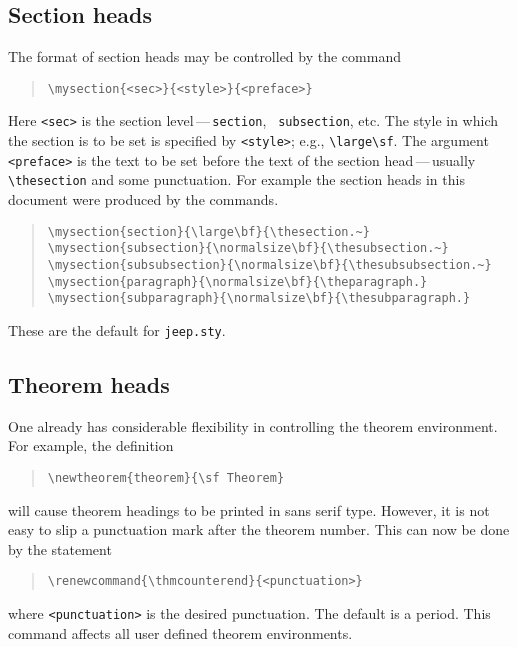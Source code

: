 \subsection{Section heads}
The format of section heads may be controlled by the command
\begin{quote}
\begin{verbatim}
\mysection{<sec>}{<style>}{<preface>}
\end{verbatim}
\end{quote}
Here {\tt <sec>} is the section level\,---\,{\tt section}, {\tt
subsection}, etc.  The style in which the section is to be set is
specified by \verb|<style>|; e.g., \verb|\large\sf|.  The argument
{\tt <preface>} is the text to be set before the text of the section
head\,---\,usually \verb|\thesection| and some punctuation.  For example
the section heads in this document were produced by the commands.
\begin{quote}
\begin{verbatim}
\mysection{section}{\large\bf}{\thesection.~}
\mysection{subsection}{\normalsize\bf}{\thesubsection.~}
\mysection{subsubsection}{\normalsize\bf}{\thesubsubsection.~}
\mysection{paragraph}{\normalsize\bf}{\theparagraph.}
\mysection{subparagraph}{\normalsize\bf}{\thesubparagraph.}
\end{verbatim}
\end{quote}
These are the default for {\tt jeep.sty}.


\subsection{Theorem heads}
One already has considerable flexibility in controlling the
theorem environment.  For example, the definition
\begin{quote}
\begin{verbatim}
\newtheorem{theorem}{\sf Theorem}
\end{verbatim}
\end{quote}
will cause theorem headings to be printed in sans serif type.
However, it is not easy to slip a punctuation mark after
the theorem number.  This can now be done by the statement
\begin{quote}
\begin{verbatim}
\renewcommand{\thmcounterend}{<punctuation>}
\end{verbatim}
\end{quote}
where {\tt <punctuation>} is the desired punctuation.  The
default is a period.  This command affects all user defined
theorem environments.

